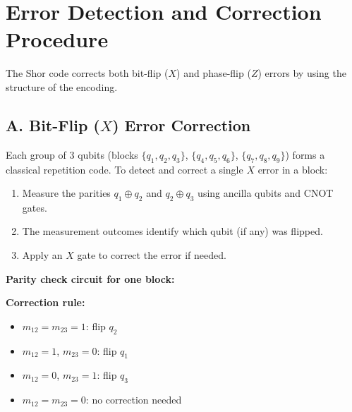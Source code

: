 \documentclass{book}
\begin{document}
\section{Error Detection and Correction Procedure}

The Shor code corrects both bit-flip ($X$) and phase-flip ($Z$) errors by using the structure of the encoding.

\subsection{A. Bit-Flip ($X$) Error Correction}

Each group of 3 qubits (blocks $\{q_1,q_2,q_3\}$, $\{q_4,q_5,q_6\}$, $\{q_7,q_8,q_9\}$) forms a classical repetition code. To detect and correct a single $X$ error in a block:

\begin{enumerate}
    \item Measure the parities $q_1 \oplus q_2$ and $q_2 \oplus q_3$ using ancilla qubits and CNOT gates.
    \item The measurement outcomes identify which qubit (if any) was flipped.
    \item Apply an $X$ gate to correct the error if needed.
\end{enumerate}

\textbf{Parity check circuit for one block:}

\textbf{Correction rule:}
\begin{itemize}
    \item $m_{12}=m_{23}=1$: flip $q_2$
    \item $m_{12}=1$, $m_{23}=0$: flip $q_1$
    \item $m_{12}=0$, $m_{23}=1$: flip $q_3$
    \item $m_{12}=m_{23}=0$: no correction needed
\end{itemize}
\end{document}

